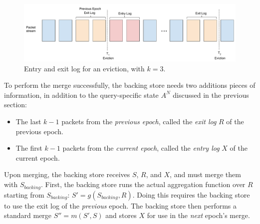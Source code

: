 \begin{figure}[h]
\centering
\includegraphics[width=0.7\linewidth]{pq_merge_tr_bph.pdf}
\caption{Entry and exit log for an eviction, with $k = 3$.}
\label{fig:bph-merge}
\end{figure}

To perform the merge successfully,
the backing
store needs two additions pieces of information, 
in addition to the query-specific state $A^N$ discussed in the previous section:
\begin{itemize}
\item The last $k-1$ packets from the \emph{previous epoch}, called the \emph{exit log} $R$ of the previous epoch.
\item The first $k-1$ packets from the \emph{current epoch}, called the \emph{entry log} $X$ of the current epoch. 
\end{itemize}

Upon merging, the backing store receives $S$, $R$, and $X$, and must merge them with $S_{backing}$. First, the backing store runs the actual aggregation function over $R$ starting from $S_{backing}$: $S' = g(S_{backing}, R)$. Doing this requires the backing store to use the exit log of the \emph{previous} epoch. The backing store then performs a standard merge
 $S'' = m(S', S)$ and stores $X$ for use in the \emph{next} epoch's merge.
